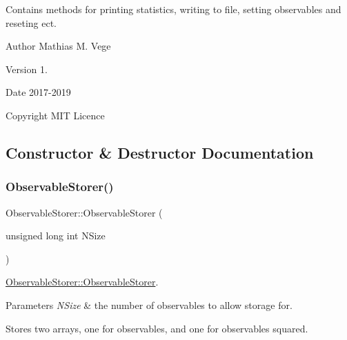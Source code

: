 Contains methods for printing statistics, writing to file, setting observables and reseting ect.

\begin{DoxyAuthor}{Author}
Mathias M. Vege 
\end{DoxyAuthor}
\begin{DoxyVersion}{Version}
1. 
\end{DoxyVersion}
\begin{DoxyDate}{Date}
2017-\/2019 
\end{DoxyDate}
\begin{DoxyCopyright}{Copyright}
M\+IT Licence 
\end{DoxyCopyright}


\subsection{Constructor \& Destructor Documentation}
\mbox{\label{class_observable_storer_a12833458c54a15e1abe299d628fc993c}} 
\subsubsection{\texorpdfstring{ObservableStorer()}{ObservableStorer()}}
{\footnotesize\ttfamily Observable\+Storer\+::\+Observable\+Storer (\begin{DoxyParamCaption}\item[{unsigned long int}]{N\+Size }\end{DoxyParamCaption})}



\mbox{\hyperlink{class_observable_storer_a12833458c54a15e1abe299d628fc993c}{Observable\+Storer\+::\+Observable\+Storer}}. 


\begin{DoxyParams}{Parameters}
{\em N\+Size} & the number of observables to allow storage for.\\
\hline
\end{DoxyParams}
Stores two arrays, one for observables, and one for observables squared. \mbox{\label{class_observable_storer_ac702a77bd6c6c0bff76d7b3959e8f658}} 
